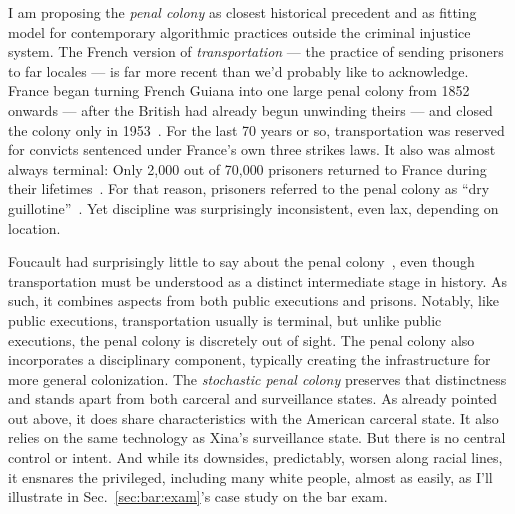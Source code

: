 I am proposing the \emph{penal colony} as closest historical precedent and as
fitting model for contemporary algorithmic practices outside the criminal
injustice system. The French version of \emph{transportation} --- the practice
of sending prisoners to far locales --- is far more recent than we'd probably
like to acknowledge. France began turning French Guiana into one large penal
colony from 1852 onwards --- after the British had already begun unwinding
theirs --- and closed the colony only in
1953~\cite{Aldrich2010,Anderson2018,Spierenburg2009}. For the last 70 years or
so, transportation was reserved for convicts sentenced under France's own three
strikes laws. It also was almost always terminal: Only 2,000 out of 70,000
prisoners returned to France during their
lifetimes~\cite{WallechinskyWallace1978}. For that reason, prisoners referred to
the penal colony as ``dry guillotine''~\cite{Furlong1913,ReneBelbenoit1938}. Yet
discipline was surprisingly inconsistent, even lax, depending on location.

Foucault had surprisingly little to say about the penal
colony~\cite{Redfield2005}, even though transportation must be understood as a
distinct intermediate stage in history. As such, it combines aspects from both
public executions and prisons. Notably, like public executions, transportation
usually is terminal, but unlike public executions, the penal colony is
discretely out of sight. The penal colony also incorporates a disciplinary
component, typically creating the infrastructure for more general colonization.
The \emph{stochastic penal colony} preserves that distinctness and stands apart
from both carceral and surveillance states. As already pointed out above, it
does share characteristics with the American carceral state. It also relies on
the same technology as Xina's surveillance state. But there is no central
control or intent. And while its downsides, predictably, worsen along racial
lines, it ensnares the privileged, including many white people, almost as
easily, as I'll illustrate in Sec.~\ref{sec:bar:exam}'s case study on the bar
exam.

